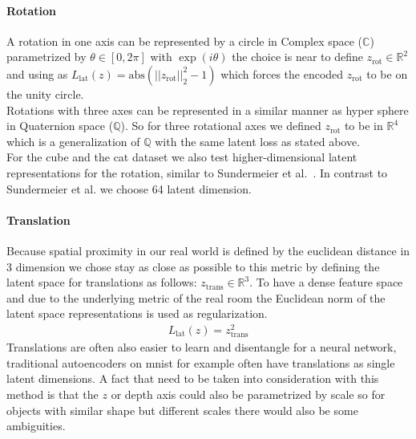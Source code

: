 \documentclass[10pt,a4paper]{article}
\newcommand{\rot}{\ensuremath{\text{rot}\xspace}}
\newcommand{\trans}{\ensuremath{\text{trans}\xspace}}
\begin{document}
\paragraph{Rotation} A rotation in one axis can be represented by a circle in Complex space ($\mathbb{C}$) parametrized by $\theta \in [0, 2 \pi]$ with $\exp(i \theta)$ the choice  is near to define $z_{\rot} \in \mathbb{R}^2$ and using as $L_{\text{lat}}(z) = \text{abs} (||z_{\rot}||_2^2 -1)$ which forces the encoded $z_{\rot}$ to be on the unity circle. \\ 
Rotations with three axes can be represented in a similar manner as hyper sphere in Quaternion space ($\mathbb{Q}$). So for three rotational axes we defined $z_{\rot}$ to be in $\mathbb{R}^4$ which is a generalization of $\mathbb{Q}$ with the same latent loss as stated above.\\
For the cube and the cat dataset we also test higher-dimensional latent
representations for the rotation, similar to Sundermeier et
al.~\cite{3D_Orientation_Learning}. In contrast to Sundermeier et al. we choose
64 latent dimension.
\paragraph{Translation} Because spatial proximity in our real world is defined by the euclidean distance in 3 dimension we chose stay as close as possible to this metric by defining the latent space for translations as follows: $z_{\trans} \in \mathbb{R}^3$. To have a dense feature space and due to the underlying metric of the real room the Euclidean norm of the latent space representations is used as regularization.
\begin{equation}
    \begin{aligned}
        L_{\text{lat}}(z) = z_{\trans}^2
    \end{aligned}
\end{equation}
Translations are often also easier to learn and disentangle for a neural network, traditional autoencoders on mnist for example often have translations as single latent dimensions. A fact that need to be taken into consideration with this method is that the $z$ or depth axis could also be parametrized by scale so for objects with similar shape but different scales there would also be some ambiguities.

\newpage
\end{document}
